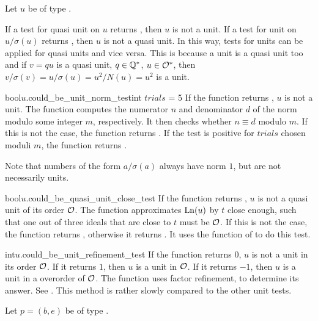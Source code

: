 Let $u$ be of type .

If a test for quasi unit on $u$ returns \FALSE, then $u$ is not a unit.  If a test for unit on
$u / \sigma(u)$ returns \FALSE, then $u$ is not a quasi unit.  In this way, tests for units can
be applied for quasi units and vice versa.  This is because a unit is a quasi unit too and if $v
= q u$ is a quasi unit, $q \in \mathbb{Q}^*$, $u\in \mathcal{O}^*$, then $v / \sigma(v) = u / \sigma(u) =
u^{2}/N(u) = u^{2}$ is a unit.

\begin{cfcode}{bool}{$u$.could_be_unit_norm_test}{int $\mathit{trials}$ = 5}
  If the function returns \FALSE, $u$ is not a unit.  The function computes the numerator $n$ and
  denominator $d$ of the norm modulo some integer $m$, respectively.  It then checks whether $n
  \equiv d$ modulo $m$.  If this is not the case, the function returns \FALSE.  If the test is
  positive for $\mathit{trials}$ chosen moduli $m$, the function returns \TRUE.
  
  Note that numbers of the form $a / \sigma(a)$ always have norm $1$, but are not necessarily
  units.
\end{cfcode}

\begin{cfcode}{bool}{$u$.could_be_quasi_unit_close_test}{}
  If the function returns \FALSE, $u$ is not a quasi unit of its order $\mathcal{O}$.  The function
  approximates $\operatorname{Ln}(u)$ by $t$ close enough, such that one out of three ideals that are close to
  $t$ must be $\mathcal{O}$.  If this is not the case, the function returns \FALSE, otherwise it returns
  \TRUE.  It uses the  function of  to do this test.
\end{cfcode}

\begin{cfcode}{int}{$u$.could_be_unit_refinement_test}{}
  If the function returns $0$, $u$ is not a unit in its order $\mathcal{O}$.  If it returns $1$, then
  $u$ is a unit in $\mathcal{O}$.  If it returns $-1$, then $u$ is a unit in a overorder of $\mathcal{O}$.  The
  function uses factor refinement, to determine its answer.  See
  \cite{Buchmann/Eisenbrand:1999}.  This method is rather slowly compared to the other unit
  tests.
\end{cfcode}



\IO

Let $p = (b,e)$ be of type .

